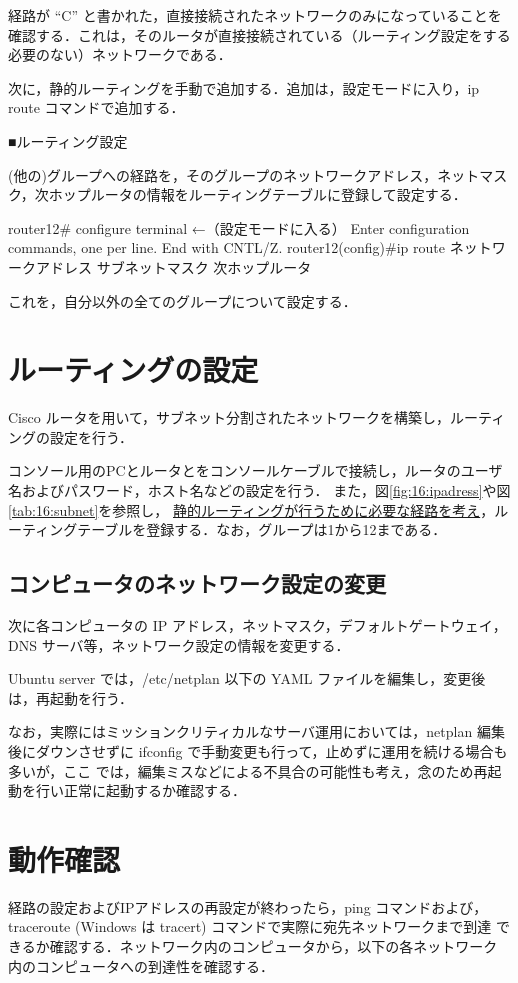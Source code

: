 経路が ``C'' と書かれた，直接接続されたネットワークのみになっていることを確認する．これは，そのルータが直接接続されている（ルーティング設定をする必要のない）ネットワークである．

次に，静的ルーティングを手動で追加する．追加は，設定モードに入り，ip route コマンドで追加する．

■ルーティング設定

(他の)グループへの経路を，そのグループのネットワークアドレス，ネットマスク，次ホップルータの情報をルーティングテーブルに登録して設定する．

\begin{cli}
router12# configure terminal                              ←（設定モードに入る）
Enter configuration commands, one per line.  End with CNTL/Z.
router12(config)#ip route ネットワークアドレス サブネットマスク 次ホップルータ
\end{cli}

これを，自分以外の全てのグループについて設定する．

\section{ルーティングの設定}
Cisco ルータを用いて，サブネット分割されたネットワークを構築し，ルーティングの設定を行う．

コンソール用のPCとルータとをコンソールケーブルで接続し，ルータのユーザ名およびパスワード，ホスト名などの設定を行う．
また，図\ref{fig:16:ipadress}や図\ref{tab:16:subnet}を参照し，
\underline{静的ルーティングが行うために必要な経路を考え}，ルーティングテーブルを登録する．なお，グループは1から12まである．


\subsection{コンピュータのネットワーク設定の変更}

次に各コンピュータの IP アドレス，ネットマスク，デフォルトゲートウェイ，
DNS サーバ等，ネットワーク設定の情報を変更する．

Ubuntu server では，/etc/netplan 以下の YAML ファイルを編集し，変更後は，再起動を行う．

なお，実際にはミッションクリティカルなサーバ運用においては，netplan 編集後にダウンさせずに ifconfig で手動変更も行って，止めずに運用を続ける場合も多いが，ここ
では，編集ミスなどによる不具合の可能性も考え，念のため再起動を行い正常に起動するか確認する．

\section{動作確認}
経路の設定およびIPアドレスの再設定が終わったら，ping コマンドおよび，
traceroute (Windows は tracert) コマンドで実際に宛先ネットワークまで到達
できるか確認する．ネットワーク内のコンピュータから，以下の各ネットワーク
内のコンピュータへの到達性を確認する．

